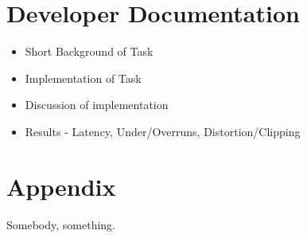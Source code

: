 \documentclass[a4paper,12pt]{report}
\begin{document}


\chapter{Developer Documentation}


\begin{itemize}
    \item Short Background of Task
    \item Implementation of Task
    \item Discussion of implementation
    \item Results - Latency, Under/Overruns, Distortion/Clipping
\end{itemize}



\chapter{Appendix}


\begin{thebibliography}{9}
 Somebody, something.
\end{thebibliography}
\end{document}
